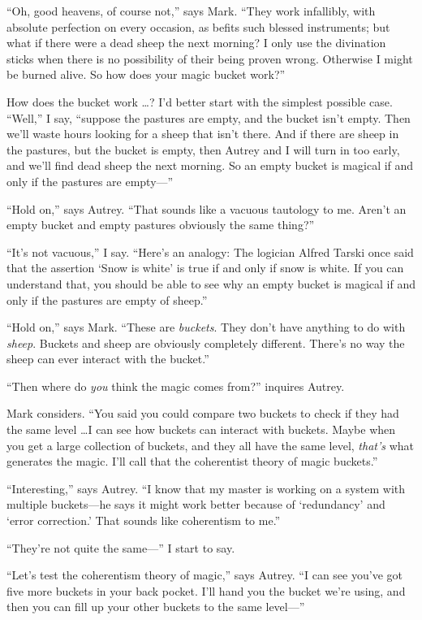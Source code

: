 {
 ``Oh, good heavens, of course
not,'' says Mark. ``They work
infallibly, with absolute perfection on every occasion, as befits such
blessed instruments; but what if there were a dead sheep the next
morning? I only use the divination sticks when there is no possibility
of their being proven wrong. Otherwise I might be burned alive. So how
does your magic bucket work?''}

{
 How does the bucket work \ldots ? I'd better start
with the simplest possible case.
``Well,'' I say,
``suppose the pastures are empty, and the bucket
isn't empty. Then we'll waste hours
looking for a sheep that isn't there. And if there are
sheep in the pastures, but the bucket is empty, then Autrey and I will
turn in too early, and we'll find dead sheep the next
morning. So an empty bucket is magical if and only if the pastures are
empty---''}

{
 ``Hold on,'' says Autrey.
``That sounds like a vacuous tautology to me.
Aren't an empty bucket and empty pastures obviously the
same thing?''}

{
 ``It's not
vacuous,'' I say.
``Here's an analogy: The logician
Alfred Tarski once said that the assertion `Snow is
white' is true if and only if snow is white. If you can
understand that, you should be able to see why an empty bucket is
magical if and only if the pastures are empty of
sheep.''}

{
 ``Hold on,'' says Mark.
``These are \textit{buckets}. They
don't have anything to do with \textit{sheep}. Buckets
and sheep are obviously completely different. There's
no way the sheep can ever interact with the
bucket.''}

{
 ``Then where do \textit{you} think the magic
comes from?'' inquires Autrey.}

{
 Mark considers. ``You said you could compare two
buckets to check if they had the same level \ldots I can see how buckets
can interact with buckets. Maybe when you get a large collection of
buckets, and they all have the same level,
\textit{that's} what generates the magic.
I'll call that the coherentist theory of magic
buckets.''}

{
 ``Interesting,'' says Autrey.
``I know that my master is working on a system with
multiple buckets---he says it might work better because of
`redundancy' and `error
correction.' That sounds like coherentism to
me.''}

{
 ``They're not quite the
same---'' I start to say.}

{
 ``Let's test the coherentism
theory of magic,'' says Autrey. ``I
can see you've got five more buckets in your back
pocket. I'll hand you the bucket we're
using, and then you can fill up your other buckets to the same
level---''}

